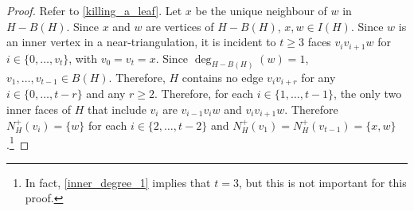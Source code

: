 \documentclass{article}
\theoremstyle{definition}
\begin{document}
\begin{proof}
  Refer to \cref{killing_a_leaf}.
  Let $x$ be the unique neighbour of $w$ in $H-B(H)$. Since $x$ and $w$ are vertices of $H-B(H)$, $x,w\in I(H)$.  Since $w$ is an inner vertex in a near-triangulation, it is incident to $t\ge 3$ faces $v_iv_{i+1}w$ for $i\in\{0,\ldots,v_{t}\}$, with $v_0=v_t=x$.  Since $\deg_{H-B(H)}(w)=1$, $v_1,\ldots,v_{t-1}\in B(H)$.  Therefore, $H$ contains no edge $v_i v_{i+r}$ for any $i\in\{0,\ldots,t-r\}$ and any $r\ge 2$.  Therefore, for each $i\in\{1,\ldots,t-1\}$, the only two inner faces of $H$ that include $v_i$ are $v_{i-1}v_iw$ and $v_iv_{i+1}w$.  Therefore $N^+_H(v_i)=\{w\}$ for each $i\in\{2,\ldots,t-2\}$ and $N^+_H(v_1)=N^+_H(v_{t-1})=\{x,w\}$.\footnote{In fact, \cref{inner_degree_1} implies that $t=3$, but this is not important for this proof.}


\end{proof}
\end{document}
